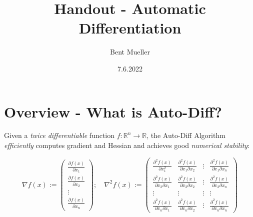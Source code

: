 \documentclass[11pt,a4paper]{article}
\def\R{{\mathbb R}}
\theoremstyle{definition} %
\begin{document}
\title{ \textbf{Handout - Automatic Differentiation} }
\author{Bent Mueller}
\date{7.6.2022}
\maketitle

\section{Overview - What is Auto-Diff?}

Given a \textit{twice differentiable} function $f: \R^n \to \R$, the
Auto-Diff Algorithm \textit{efficiently} computes gradient and Hessian
and achieves good \textit{numerical stability}:

\[
	\nabla f(x) := \begin{pmatrix}
		\frac{\partial f(x)}{\partial x_1} \\
		\frac{\partial f(x)}{\partial x_2} \\
		\vdots                             \\
		\frac{\partial f(x)}{\partial x_n}
	\end{pmatrix} ;
	\quad
	\nabla ^2 f(x) :=
	\begin{pmatrix}
		\frac{\partial^2 f(x)}{\partial x_1^2}            &
		\frac{\partial^2 f(x)}{\partial x_1 \partial x_2} &
		\vdots                                            &
		\frac{\partial^2 f(x)}{\partial x_1 \partial x_n}   \\
		\frac{\partial^2 f(x)}{\partial x_2 \partial x_1} &
		\frac{\partial^2 f(x)}{\partial x_2 \partial x_2} &
		\vdots                                            &
		\frac{\partial^2 f(x)}{\partial x_2 \partial x_n}   \\
		\vdots                                            &
		\vdots                                            &
		\vdots                                            &
		\vdots                                              \\
		\frac{\partial^2 f(x)}{\partial x_n \partial x_1} &
		\frac{\partial^2 f(x)}{\partial x_n \partial x_2} &
		\vdots                                            &
		\frac{\partial^2 f(x)}{\partial x_n \partial x_n}
	\end{pmatrix}
\]
\end{document}
